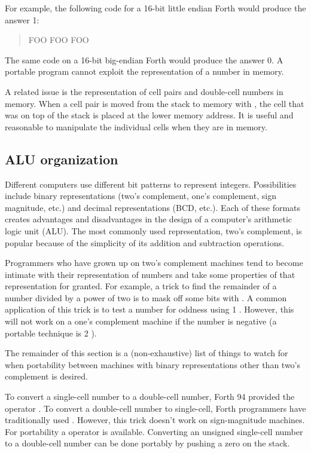 For example, the following code for a 16-bit little endian Forth
would produce the answer 1:
\begin{quote}\ttfamily
	 FOO
	 FOO \word{!}
	\quad FOO 
\end{quote}

The same code on a 16-bit big-endian Forth would produce the
answer 0. A portable program cannot exploit the representation
of a number in memory.

A related issue is the representation of cell pairs and double-cell
numbers in memory. When a cell pair is moved from the stack to memory
with , the cell that was on top of the stack is placed at the
lower memory address. It is useful and reasonable to manipulate the
individual cells when they are in memory.

\subsection{ALU organization} %

Different computers use different bit patterns to represent integers.
Possibilities include binary representations (two's complement, one's
complement, sign magnitude, etc.) and decimal representations (BCD,
etc.). Each of these formats creates advantages and disadvantages in
the design of a computer's arithmetic logic unit (ALU). The most
commonly used representation, two's complement, is popular because of
the simplicity of its addition and subtraction operations.

Programmers who have grown up on two's complement machines tend to
become intimate with their representation of numbers and take some
properties of that representation for granted. For example, a trick
to find the remainder of a number divided by a power of two is to mask
off some bits with . A common application of this trick is
to test a number for oddness using 1 . However, this will
not work on a one's complement machine if the number is negative (a
portable technique is 2 ).

The remainder of this section is a (non-exhaustive) list of things to
watch for when portability between machines with binary representations
other than two's complement is desired.

To convert a single-cell number to a double-cell number, Forth 94
provided the operator . To convert a double-cell number to
single-cell, Forth programmers have traditionally used .
However, this trick doesn't work on sign-magnitude machines. For
portability a  operator is available. Converting an
unsigned single-cell number to a double-cell number can be done portably
by pushing a zero on the stack.


